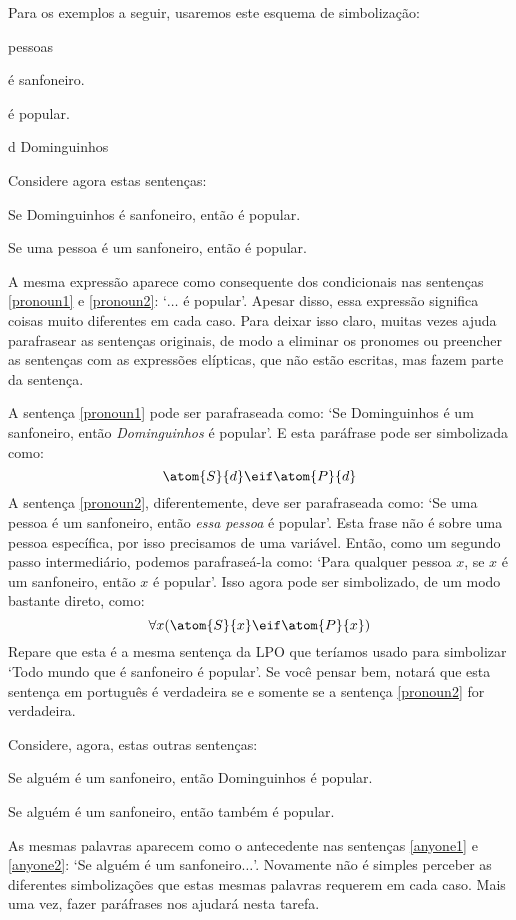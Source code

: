 Para os exemplos a seguir, usaremos este esquema de simbolização:
	\begin{center}
	\begin{ekey}
		\item[\text{domínio}] pessoas
		\item[\atom{S}{x}]  é sanfoneiro.
		\item[\atom{P}{x}]  é popular.
		\item[d] Dominguinhos
	\end{ekey}
	\end{center}
Considere agora estas sentenças:
	\begin{earg}
		\item[\ex{pronoun1}] Se Dominguinhos é sanfoneiro, então é popular.
		\item[\ex{pronoun2}] Se uma pessoa é um sanfoneiro, então é popular.
	\end{earg}
A mesma expressão aparece como consequente dos condicionais nas sentenças \ref{pronoun1} e \ref{pronoun2}: `$\ldots$ é popular'.
Apesar disso, essa expressão significa coisas muito diferentes em cada caso.
Para deixar isso claro, muitas vezes ajuda parafrasear as sentenças originais, de modo a eliminar os pronomes ou preencher as sentenças com as expressões elípticas, que não estão escritas, mas fazem parte da sentença.

A sentença \ref{pronoun1} pode ser parafraseada como: `Se Dominguinhos é um sanfoneiro, então \emph{Dominguinhos} é popular'. E esta paráfrase pode ser simbolizada como:
$$\atom{S}{d} \eif \atom{P}{d}$$
A sentença \ref{pronoun2}, diferentemente, deve ser parafraseada como:
`Se uma pessoa é um sanfoneiro, então \emph{essa pessoa} é popular'.
Esta frase não é sobre uma pessoa específica, por isso precisamos de uma variável.
Então, como um segundo passo intermediário, podemos parafraseá-la como:
`Para qualquer pessoa $x$, se $x$ é um sanfoneiro, então $x$ é popular'.
Isso agora pode ser simbolizado, de um modo bastante direto, como:
$$\forall x (\atom{S}{x} \eif \atom{P}{x})$$
Repare que esta é a mesma sentença da LPO que teríamos usado para simbolizar `Todo mundo que é sanfoneiro é popular'.
Se você pensar bem, notará que esta sentença em português é verdadeira se e somente se a sentença \ref{pronoun2} for verdadeira.

Considere, agora, estas outras sentenças:
	\begin{earg}
		\item[\ex{anyone1}] Se alguém é um sanfoneiro, então Dominguinhos é popular.
		\item[\ex{anyone2}] Se alguém é um sanfoneiro, então também é popular.
	\end{earg}
As mesmas palavras aparecem como o antecedente nas sentenças \ref{anyone1} e \ref{anyone2}: `Se alguém é um sanfoneiro$\ldots$'.
Novamente não é simples perceber as diferentes simbolizações que estas mesmas palavras requerem em cada caso.
Mais uma vez, fazer paráfrases nos ajudará nesta tarefa. 

